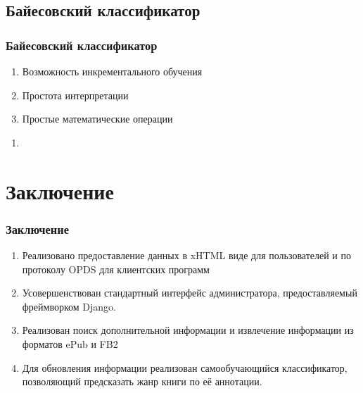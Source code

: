 \documentclass[handout]{beamer}
\begin{document}
\subsection{Байесовский классификатор}
	\begin{frame}
		\frametitle{Байесовский классификатор}
		  \begin{enumerate}
		    \item Возможность инкрементального обучения
		    \item Простота интерпретации
		    \item Простые математические операции
		  \end{enumerate}
		  
		  \begin{enumerate}
		    \item 
		  \end{enumerate}		  		  
	\end{frame}

\section{Заключение}
  \begin{frame}
    \frametitle{Заключение}
    \begin{enumerate}
      \item Реализовано предоставление данных в xHTML виде для пользователей и по протоколу OPDS для клиентских программ	  
	  \item Усовершенствован стандартный интерфейс администратора, предоставляемый фреймворком Django.
	  \item Реализован поиск дополнительной информации и извлечение информации из форматов ePub и FB2
      \item Для обновления информации реализован самообучающийся классификатор, позволяющий предсказать жанр книги по её аннотации.
	  
    \end{enumerate}
  \end{frame}
\end{document}
